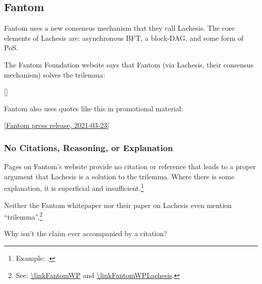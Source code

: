 
\subsection{Fantom}

Fantom uses a new consensus mechanism that they call Lachesis.
The core elements of Lachesis are: asynchronous BFT, a block-DAG, and some form of PoS.

The Fantom Foundation website says that Fantom (via Lachesis, their consensus mechanism) solves the trilemma:






[\citeFantomLachesis]

Fantom also uses quotes like this in promotional material:

[{\href{\linkFantomIndexingSoln}{Fantom press release, 2021-03-23}}]

\subsubsection{No Citations, Reasoning, or Explanation}

Pages on Fantom's website provide no citation or reference that leads to a proper argument that Lachesis is a solution to the trilemma.
Where there is some explanation, it is superficial and insufficient.\footnote{
    Example: \citeFantomLachesis.
}

Neither the Fantom whitepaper nor their paper on Lachesis even mention ``trilemma''.\footnote{
    See: \url{\linkFantomWP} and \url{\linkFantomWPLachesis}.
}

Why isn't the claim ever accompanied by a citation?



